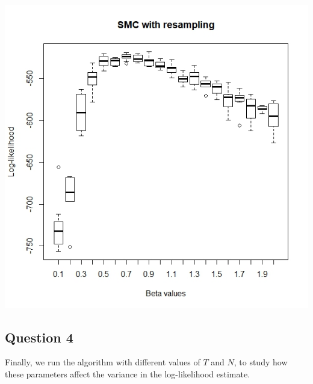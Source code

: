 \documentclass[]{article}
\begin{document}
	\\
	\includegraphics[width=\columnwidth]{task1/SIR_N_1000_T_500.jpeg}
	
	\subsection*{Question 4}
	Finally, we run the algorithm with different values of $T$ and $N$, to study how these parameters affect the variance in the log-likelihood estimate. 
	
\end{document}
